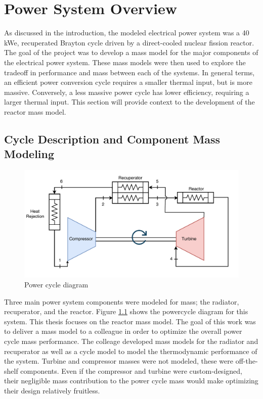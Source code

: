\chapter{Power System Overview}
As discussed in the introduction, the modeled electrical power system was a 40
kWe, recuperated Brayton cycle driven by a direct-cooled nuclear fission reactor. The goal
of the project was to develop a mass model for the major components of the
electrical power system. These mass models were then used to explore the
tradeoff in performance and mass between each of the systems. In general terms,
an efficient power conversion cycle requires a smaller thermal input, but is
more massive. Conversely, a less massive power cycle has lower efficiency,
requiring a larger thermal input. This section will provide context to the
development of the reactor mass model.

\section{Cycle Description and Component Mass Modeling}

\begin{figure}[h]
    \centering
    \includegraphics[width=5in]{../images/power_cycle.png}
\caption{Power cycle diagram}
\label{fig:power_cycle}
\end{figure}

Three main power system components were modeled for
mass; the radiator, recuperator, and the reactor. 
Figure \ref{fig:power_cycle} shows the powercycle diagram for this system.
This thesis focuses on the reactor mass model. The goal of this work was to deliver a mass
model to a colleague in order to optimize the overall power cycle mass
performance. The colleage developed mass models for the radiator and recuperator
as well as a cycle model to model the thermodynamic performance of the system.
Turbine and compressor masses were not modeled, these were off-the-shelf
components. Even if the compressor and turbine were custom-designed, their
negligible mass contribution to the power cycle mass would make optimizing their
design relatively fruitless.

